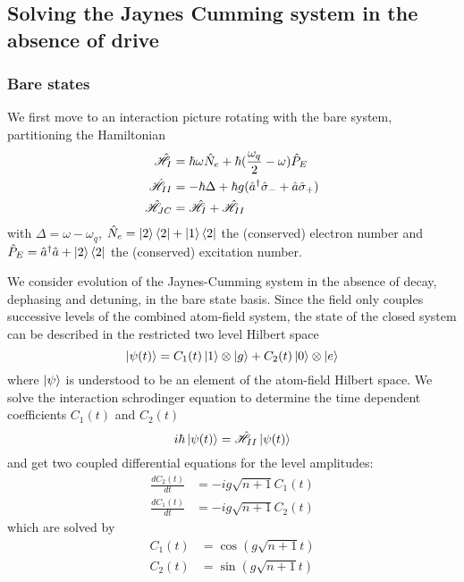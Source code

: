 \subsection{Solving the Jaynes Cumming system in the absence of drive}
\subsubsection{Bare states}
We first move to an interaction picture rotating with the bare system, partitioning the Hamiltonian
\begin{align}
	\hat{\mathscr{H}}_I &= \hbar \omega \hat{N}_e + \hbar(\frac{\omega_q}{2}-\omega)\hat{P}_E \\
	\hat{\mathscr{H}}_{II} &= -\hbar \Delta + \hbar g ({\hat{a}^\dagger} \hat{\sigma}_- + \hat{a} \hat{\sigma}_+) \\
	\hat{\mathscr{H}}_{JC} &= \hat{\mathscr{H}}_I+\hat{\mathscr{H}}_{II}
\end{align}
with $\Delta = \omega-\omega_q$,   $\hat{N}_e = \ket{2} \bra{2} + \ket{1} \bra{2} $ the (conserved) electron number and $\hat{P}_E = {\hat{a}^\dagger}\hat{a} + \ket{2}\bra{2} $ the (conserved) excitation number.

We consider evolution of the Jaynes-Cumming system in the absence of decay, dephasing and detuning, in the bare state basis.
Since the field only couples successive levels of the combined atom-field system, the state of the closed system can be described in the restricted two level Hilbert space
\begin{equation}
	\ket{\psi(t)} = C_1(t) \ket{1} \otimes\ket{g} + C_2(t) \ket{0} \otimes\ket{e}
\end{equation}
where $\ket{\psi}$ is understood to be an element of the atom-field Hilbert space.
We solve the interaction schrodinger equation to determine the time dependent coefficients $C_1(t)$ and $C_2(t)$
\begin{equation}
	i \hbar\ket{\psi(t)} = \hat{\mathscr{H}}_{II} \ket{\psi(t)}
\end{equation}
and get two coupled differential equations for the level amplitudes:
\begin{align}
	\frac{d C_2(t)}{dt} &= -i g \sqrt{n+1}C_1(t)\\
	\frac{d C_1(t)}{dt} &= -i g \sqrt{n+1}C_2(t)
\end{align}
which are solved by
\begin{align}
  C_1(t) &= \cos(g\sqrt{n+1}t)\\
  C_2(t) &= \sin(g\sqrt{n+1}t)
\end{align}
